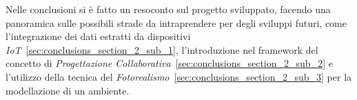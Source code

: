 Nelle conclusioni si è fatto un resoconto sul progetto sviluppato, facendo una panoramica sulle possibili strade
da intraprendere per degli sviluppi futuri, come l'integrazione dei dati estratti da dispositivi
\emph{IoT}~\ref{sec:conclusions_section_2_sub_1},
l'introduzione nel framework del concetto di \emph{Progettazione Collaborativa}~\ref{sec:conclusions_section_2_sub_2}
e l'utilizzo della tecnica del \emph{Fotorealismo}~\ref{sec:conclusions_section_2_sub_3} per la modellazione di un ambiente.

